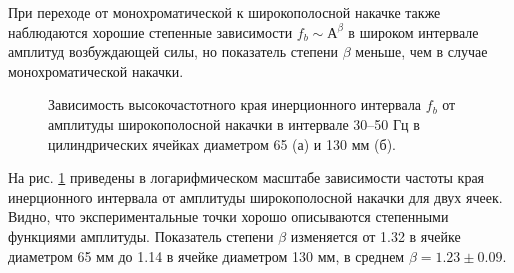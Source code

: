 При переходе от монохроматической к широкополосной накачке также наблюдаются хорошие степенные зависимости $f_b \sim А^\beta$ в широком интервале амплитуд возбуждающей силы, но показатель степени $\beta$ меньше, чем в случае монохроматической накачки.

\begin{figure}[ht]
  \begin{minipage}[ht]{0.49\linewidth}
  \end{minipage}
  \hfill
  \begin{minipage}[ht]{0.49\linewidth}
  \end{minipage}
  \caption{Зависимость высокочастотного края инерционного интервала $f_b$ от амплитуды широкополосной накачки в интервале 30–50 Гц в цилиндрических ячейках диаметром 65 (а) и 130 мм (б).}
  \label{img:water_fb_wide}  
\end{figure}

На рис. \ref{img:water_fb_wide} приведены в логарифмическом масштабе зависимости частоты края инерционного интервала от амплитуды широкополосной накачки для двух ячеек. Видно, что экспериментальные точки хорошо описываются степенными функциями амплитуды. Показатель степени $\beta$ изменяется от 1.32 в ячейке диаметром 65 мм до 1.14 в ячейке диаметром 130 мм, в среднем $\beta = 1.23 \pm 0.09$.

